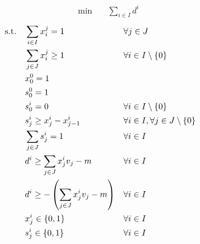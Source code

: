 \begin{align}
    \min\quad       & \sum_{i \in I} d^i
    \label{eq:equals-obj}
\end{align}
\vspace*{-6mm}
\begin{align}
    \text{s.t.\quad}
    \label{eq:equals-c1}
    & \sum_{i \in I}{x_i^j = 1}                             &   & \forall j \in J                                  \\
    \label{eq:equals-c2}
    & \sum_{j \in J}{x_i^j} \geq 1                          &   & \forall i \in I \setminus \{0\}                  \\
    \label{eq:equals-c3}
    & x^0_0 = 1                                             &   &                                                  \\
    \label{eq:equals-c4}
    & s^0_0 = 1                                             &   &                                                  \\
    \label{eq:equals-c5}
    & s^i_0 = 0                                             &   & \forall i \in I \setminus \{0\}                  \\
    \label{eq:equals-c6}
    & s^i_j \geq x^i_j - x^i_{j-1}                          &   & \forall i \in I, \forall j \in J \setminus \{0\} \\
    \label{eq:equals-c7}
    & \sum_{j \in J}{s^i_j} = 1                             &   & \forall i \in I                                  \\
    \label{eq:equals-c8}
    & d^i \geq \sum_{j \in J}{x^i_jv_j} - m                 &   & \forall i \in I                                  \\
    \label{eq:equals-c9}
    & d^i \geq -\left(\sum_{j \in J}{x^i_jv_j} - m\right)   &   & \forall i \in I                                  \\
    \label{eq:equals-c10}
    & x^i_j \in \{0, 1\}   &   & \forall i \in I            &   &                                                  \\
    \label{eq:equals-c11}
    & s^i_j \in \{0, 1\}   &   & \forall i \in I
\end{align}